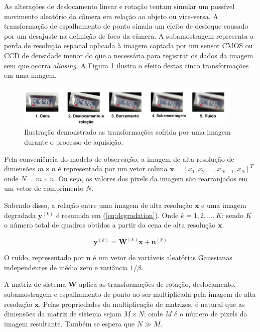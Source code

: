 As alterações de deslocamento linear e rotação tentam simular um possível movimento
aleatório da câmera em relação ao objeto ou vice-versa.
A transformação de espalhamento de ponto simula um efeito de desfoque causado por um
desajuste na definição de foco da câmera.
A subamostragem representa a perda de resolução espacial aplicada à imagem captada
por um sensor CMOS ou CCD de densidade menor do que a necessária para registrar os dados da imagem sem que ocorra \emph{aliasing}.
A Figura \ref{fig:image_transformations} ilustra o efeito destas cinco transformações em uma imagem.

\begin{figure}[h]
	\centering
	\caption{\label{fig:image_transformations}Ilustração demonstrado as transformações sofrida por uma imagem durante o processo de aquisição.}
	\includegraphics[width=0.95\textwidth]{./figures/image_transformations.pdf}
\end{figure}

Pela conveniência do modelo de observação, a imagem de alta resolução de dimensões $m \times n$ é representada por um vetor coluna $\mathbf{x} = [x_1, x_2, ... , x_{N-1}, x_N]^T$ onde $N ={} m \times n$. Ou seja, os valores dos pixels da imagem são rearranjados em um vetor de comprimento $N$.

Sabendo disso, a relação entre uma imagem de alta resolução $\mathbf{x}$ e uma imagem degradada $\mathbf{y}^{(k)}$ é resumida em (\ref{eq:degradation}). Onde $k = 1,2,...,K$; sendo $K$ o número total de quadros obtidos a partir da cena de alta resolução $\mathbf{x}$.

\begin{equation}
	\label{eq:degradation}
	\mathbf{y}^{(k)} = \mathbf{W}^{(k)}\mathbf{x} + \mathbf{n}^{(k)}
\end{equation}

O ruído, representado por $\mathbf{n}$ é um vetor de variáveis aleatórias Gaussianas independentes de média zero e variância $1/\beta$.

A matriz de sistema $\mathbf{W}$ aplica as transformações de rotação, deslocamento, subamostragem e espalhamento de ponto ao ser multiplicada pela imagem de alta resolução $\mathbf{x}$.
Pelas propriedades da multiplicação de matrizes, é natural que as dimensões da matriz de sistema sejam $M \times N$; onde $M$ é o número de pixels da imagem resultante.
Também se espera que $N \gg M$.

